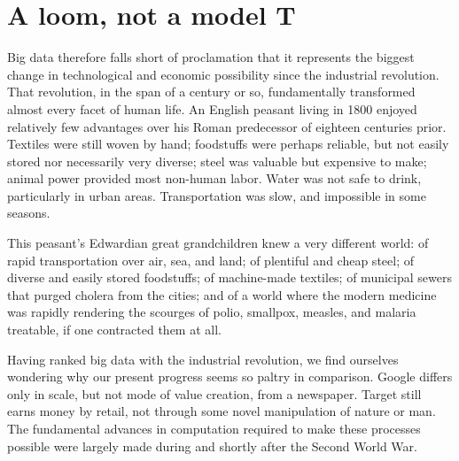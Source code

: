\documentclass[12pt]{article}
\begin{document}
\section{A loom, not a model T}
\label{sec:loom-not-model}

Big data therefore falls short of proclamation that it represents the
biggest change in technological and economic possibility since the
industrial revolution. That revolution, in the span of a century or
so, fundamentally transformed almost every facet of human life. An
English peasant living in 1800 enjoyed relatively few advantages over
his Roman predecessor of eighteen centuries prior. Textiles were still
woven by hand; foodstuffs were perhaps reliable, but not easily stored
nor necessarily very diverse; steel was valuable but expensive to
make; animal power provided most non-human labor. Water was not safe
to drink, particularly in urban areas. Transportation was slow, and
impossible in some seasons.

This peasant's Edwardian great grandchildren knew a very different
world: of rapid transportation over air, sea, and land; of plentiful
and cheap steel; of diverse and easily stored foodstuffs; of
machine-made textiles; of municipal sewers that purged cholera from
the cities; and of a world where the modern medicine
was rapidly rendering the scourges of polio, smallpox, measles,
and malaria treatable, if one contracted them at all. 

Having ranked big data with the industrial revolution, we find
ourselves wondering why our present progress seems so paltry in
comparison. Google differs only in scale, but not mode of value
creation, from a newspaper. Target still earns money by retail, not
through some novel manipulation of nature or man. The fundamental
advances in computation required to make these processes possible were
largely made during and shortly after the Second World War. 

\end{document}
